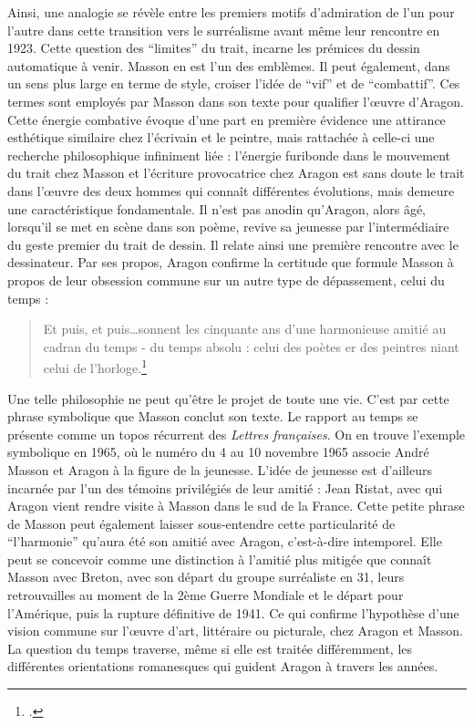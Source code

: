 	Ainsi, une analogie se révèle entre les premiers motifs d’admiration de l’un pour l’autre dans cette transition vers le surréalisme avant même leur rencontre en 1923. Cette question des \enquote{limites} du trait, incarne les prémices du dessin automatique à venir. Masson en est l’un des emblèmes. Il peut également, dans un sens plus large en terme de style, croiser l’idée de \enquote{vif} et de \enquote{combattif}. Ces termes sont employés par Masson dans son texte pour qualifier l’\oe{}uvre d’Aragon. Cette énergie combative évoque d’une part en première évidence une attirance esthétique similaire chez l’écrivain et le peintre, mais rattachée à celle-ci une recherche philosophique infiniment liée : l’énergie furibonde dans le mouvement du trait chez Masson et l’écriture provocatrice chez Aragon est sans doute le trait dans l’\oe{}uvre des deux hommes qui connaît différentes évolutions, mais demeure une caractéristique fondamentale. Il n’est pas anodin qu’Aragon, alors âgé, lorsqu'il se met en scène dans son poème, revive sa jeunesse par l’intermédiaire du geste premier du trait de dessin. Il relate ainsi une première rencontre avec le dessinateur. Par ses propos, Aragon confirme la certitude que formule Masson à propos de leur obsession commune sur un autre type de dépassement, celui du temps : 
\begin{verse}    
Et puis, et puis…sonnent les cinquante ans d’une harmonieuse amitié au cadran du temps - du temps absolu : celui des poètes er des peintres niant celui de l’horloge.\footcite[p84]{rebelle}\end{verse}


	Une telle philosophie ne peut qu’être le projet de toute une vie. C’est par cette phrase symbolique que Masson conclut son texte. Le rapport au temps se présente comme un topos récurrent des \emph{Lettres françaises}. On en trouve l'exemple symbolique en 1965, où le numéro du 4 au 10 novembre 1965 associe André Masson et Aragon à la figure de la jeunesse. L'idée de jeunesse est d'ailleurs incarnée par l'un des témoins privilégiés de leur amitié : Jean Ristat, avec qui Aragon vient rendre visite à Masson dans le sud de la France. Cette petite phrase de Masson peut également laisser sous-entendre cette particularité de \enquote{l’harmonie} qu’aura été son amitié avec Aragon, c’est-à-dire intemporel. Elle peut se concevoir comme une distinction à l’amitié plus mitigée que connaît Masson avec Breton, avec son départ du groupe surréaliste en 31, leurs retrouvailles au moment de la 2ème Guerre Mondiale et le départ pour l’Amérique, puis la rupture définitive de 1941. Ce qui confirme l’hypothèse d’une vision commune sur l’\oe{}uvre d’art, littéraire ou picturale, chez Aragon et Masson. La question du temps traverse, même si elle est traitée différemment, les différentes orientations romanesques qui guident Aragon à travers les années.

